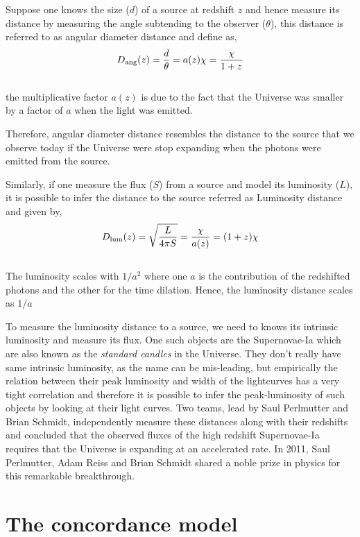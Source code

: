 Suppose one knows the size ($d$) of a source at redshift $z$ and hence measure its
distance by measuring the angle subtending to the observer ($\theta$), this distance is referred
to as angular diameter distance and define as,
\begin{equation}
	D_{\rm ang}(z) = \dfrac{d}{\theta} = a(z)\chi = \dfrac{\chi}{1+z}
\end{equation}
\\
the multiplicative factor $a(z)$ is due to the fact that the Universe was smaller by 
a factor of $a$ when the light was emitted. 

Therefore, angular diameter distance 
resembles the distance to the source that we observe today if the Universe were
stop expanding when the photons were emitted from the source.

Similarly, if one measure the flux ($S$) from a source and model its luminosity ($L$), it is
possible to infer the distance to the source referred as Luminosity distance and 
given by,
\begin{equation}
	D_{\rm lum}(z) = \sqrt{\dfrac{L}{4\pi S}} = \dfrac{\chi}{a(z)} = (1+z)\chi
\end{equation}
\\
The luminosity scales with $1/a^2$ where one $a$ is the contribution of the redshifted
photons and the other for the time dilation. Hence, the luminosity distance scales
as $1/a$

To measure the luminosity distance to a source, we need to 
knows its intrinsic luminosity and measure its flux. One such objects are the
Supernovae-Ia which are also known as the {\it standard candles} in the Universe. They
don't really have same intrinsic luminosity, as the name can be mis-leading, but 
empirically the relation between their peak luminosity and width of the lightcurves
has a very tight correlation and therefore it is possible to infer the peak-luminosity
of such objects by looking at their light curves. Two teams, lead by Saul Perlmutter and
Brian Schmidt, independently measure these distances along with their redshifts and
concluded that the observed fluxes of the high redshift Supernovae-Ia requires that
the Universe is expanding at an accelerated rate. In 2011, Saul Perlmutter, Adam Reiss and
Brian Schmidt shared a noble prize in physics for this remarkable breakthrough. 




\section{The concordance model}

